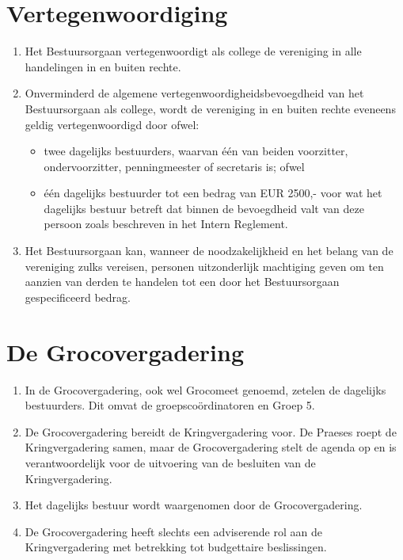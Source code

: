 \section{Vertegenwoordiging}\label{ArtikelVertegenwoordiging}
    \begin{enumerate}
    \item Het Bestuursorgaan vertegenwoordigt als college de vereniging in alle handelingen in en buiten rechte.
    \item Onverminderd de algemene vertegenwoordigheidsbevoegdheid van het Bestuursorgaan als college, wordt de vereniging in en buiten rechte eveneens geldig vertegenwoordigd door ofwel:
        \begin{itemize}
        \item twee dagelijks bestuurders, waarvan één van beiden voorzitter, ondervoorzitter, penningmeester of secretaris is; ofwel
        \item één dagelijks bestuurder tot een bedrag van EUR 2500,- voor wat het dagelijks bestuur betreft dat binnen de bevoegdheid valt van deze persoon zoals beschreven in het Intern Reglement.
        \end{itemize}\label{ParLimietenVertegenwoordiging}
    \item Het Bestuursorgaan kan, wanneer de noodzakelijkheid en het belang van de vereniging zulks vereisen, personen uitzonderlijk machtiging geven om ten aanzien van derden te handelen tot een door het Bestuursorgaan gespecificeerd bedrag.
    \end{enumerate}

\section{De Grocovergadering}
\begin{enumerate}
    \item In de Grocovergadering, ook wel Grocomeet genoemd, zetelen de dagelijks bestuurders. Dit omvat de groepsco\"ordinatoren en Groep 5.
    \item De Grocovergadering bereidt de Kringvergadering voor. De Praeses roept de Kringvergadering samen, maar de Grocovergadering stelt de agenda op en is verantwoordelijk voor de uitvoering van de besluiten van de Kringvergadering.
    \item Het dagelijks bestuur wordt waargenomen door de Grocovergadering.
    \item De Grocovergadering heeft slechts een adviserende rol aan de Kringvergadering met betrekking tot budgettaire beslissingen. 
    \end{enumerate}

